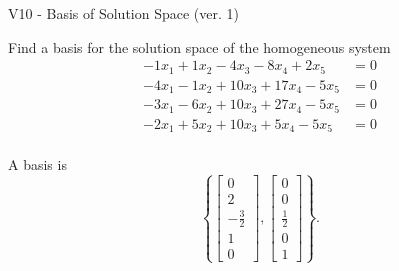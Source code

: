 \begin{exercise}
  \begin{exerciseTitle}V10 - Basis of Solution Space (ver. 1)\end{exerciseTitle}
  \begin{exerciseStatement}
    Find a basis for the solution space of the homogeneous system 
\begin{align*}
 -1 x_ 1 + 1 x_ 2 -4 x_ 3 -8 x_ 4 + 2 x_ 5 &= 0  \\ 
  -4 x_ 1 -1 x_ 2 + 10 x_ 3 + 17 x_ 4 -5 x_ 5 &= 0  \\ 
  -3 x_ 1 -6 x_ 2 + 10 x_ 3 + 27 x_ 4 -5 x_ 5 &= 0  \\ 
  -2 x_ 1 + 5 x_ 2 + 10 x_ 3 + 5 x_ 4 -5 x_ 5 &= 0  \\ 
 \end{align*}


 
  \end{exerciseStatement}

  \begin{exerciseAnswer}
   A basis is   
\[\left\{\left[\begin{array}{c}
0 \\
2 \\
-\frac{3}{2} \\
1 \\
0
\end{array}\right] , \left[\begin{array}{c}
0 \\
0 \\
\frac{1}{2} \\
0 \\
1
\end{array}\right]\right\}.\]

  


  \end{exerciseAnswer}
\end{exercise}